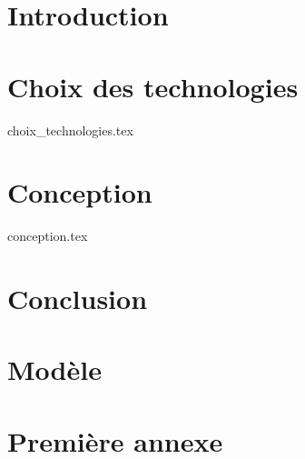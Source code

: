 \documentclass[
    reds, %
    il, %
]{heig-tb}
\begin{document}
\maketitle
\frontmatter

\preamble
\authentification

%    

\clearemptydoublepage
{
    \tableofcontents
    \let\cleardoublepage
    \listoffigures
    \let\cleardoublepage
    \listoftables
    \let\cleardoublepage
    \listoflistings
}

\printnomenclature
\clearemptydoublepage
{}

\mainmatter

\chapter{Introduction}



\chapter{Choix des technologies}
 {choix_technologies.tex}

\chapter{Conception}
 {conception.tex}

\chapter{Conclusion}


\chapter{Modèle}


\clearpage
\printbibliography

\appendix
\appendixpage
\addappheadtotoc

\chapter{Première annexe}
\end{document}
